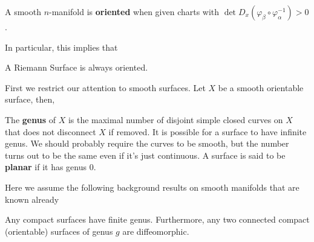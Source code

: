 \documentclass{article}
\begin{document}
\begin{definition}
    A smooth $n$-manifold is \textbf{oriented} when given charts with $\det D_x(\varphi_\beta \circ \varphi_\alpha^{-1}) > 0$.
\end{definition}

In particular, this implies that
\begin{proposition}
    A Riemann Surface is always oriented.
\end{proposition}

First we restrict our attention to smooth surfaces. Let $X$ be a smooth orientable surface, then,

\begin{definition}
    The \textbf{genus} of $X$ is the maximal number of disjoint simple closed curves on $X$ that does not disconnect $X$ if removed. It is possible for a surface to have infinite genus. We should probably require the curves to be smooth, but the number turns out to be the same even if it's just continuous. A surface is said to be \textbf{planar} if it has genus $0$.
\end{definition}

Here we assume the following background results on smooth manifolds that are known already
\begin{theorem}
    Any compact surfaces have finite genus. Furthermore, any two connected compact (orientable) surfaces of genus $g$ are diffeomorphic.
\end{theorem}
\end{document}
